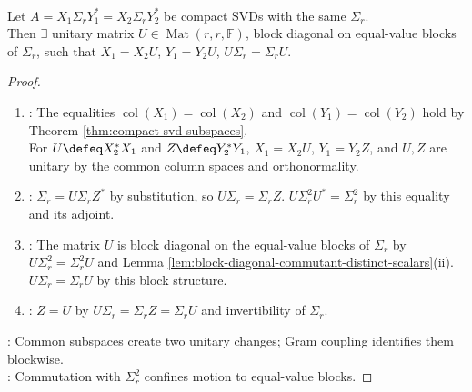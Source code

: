 \begin{theorem} \label{thm:compact-svd-unitary-ambiguity} \\
Let $A=X_1\Sigma_rY_1^*=X_2\Sigma_rY_2^*$ be compact SVDs with the same $\Sigma_r$.\\
Then $\exists$ unitary matrix $U\in\operatorname{Mat}(r,r,\mathbb{F})$, block diagonal on equal-value blocks of $\Sigma_r$, such that $X_1=X_2U$, $Y_1=Y_2U$, $U\Sigma_r=\Sigma_rU$.
\begin{proof}
\begin{enumerate}[label=(\roman*)]
\setlength{\itemsep}{0pt}
\item {}: The equalities $\operatorname{col}(X_1)=\operatorname{col}(X_2)$ and $\operatorname{col}(Y_1)=\operatorname{col}(Y_2)$ hold by Theorem \ref{thm:compact-svd-subspaces}.\\
For $U\defeq X_2^*X_1$ and $Z\defeq Y_2^*Y_1$, $X_1=X_2U$, $Y_1=Y_2Z$, and $U,Z$ are unitary by the common column spaces and orthonormality.
\item {}: $\Sigma_r=U\Sigma_rZ^*$ by substitution, so $U\Sigma_r=\Sigma_rZ$. $U\Sigma_r^2U^*=\Sigma_r^2$ by this equality and its adjoint.
\item {}: The matrix $U$ is block diagonal on the equal-value blocks of $\Sigma_r$ by $U\Sigma_r^2=\Sigma_r^2U$ and Lemma \ref{lem:block-diagonal-commutant-distinct-scalars}(ii).\\
$U\Sigma_r=\Sigma_rU$ by this block structure.
\item {}: $Z=U$ by $U\Sigma_r=\Sigma_rZ=\Sigma_rU$ and invertibility of $\Sigma_r$.
\end{enumerate}
: Common subspaces create two unitary changes; Gram coupling identifies them blockwise.\\
: Commutation with $\Sigma_r^2$ confines motion to equal-value blocks.
\end{proof}
\end{theorem}

